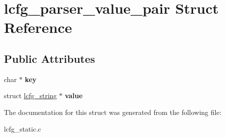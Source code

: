 \hypertarget{structlcfg__parser__value__pair}{\section{lcfg\+\_\+parser\+\_\+value\+\_\+pair Struct Reference}
\label{structlcfg__parser__value__pair}
}
\subsection*{Public Attributes}
\begin{DoxyCompactItemize}
\item 
\hypertarget{structlcfg__parser__value__pair_af285c1ce4cf893f06ac6fe2567e5d6d2}{char $\ast$ {\bfseries key}}\label{structlcfg__parser__value__pair_af285c1ce4cf893f06ac6fe2567e5d6d2}

\item 
\hypertarget{structlcfg__parser__value__pair_a53dd94b220d778f307b6aa265b469c11}{struct \hyperlink{structlcfg__string}{lcfg\+\_\+string} $\ast$ {\bfseries value}}\label{structlcfg__parser__value__pair_a53dd94b220d778f307b6aa265b469c11}

\end{DoxyCompactItemize}


The documentation for this struct was generated from the following file\+:\begin{DoxyCompactItemize}
\item 
lcfg\+\_\+static.\+c\end{DoxyCompactItemize}
